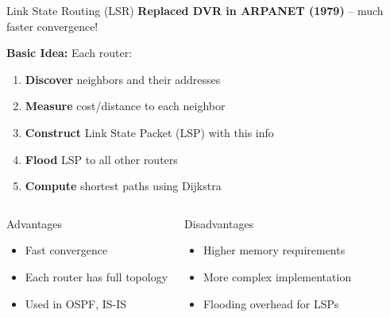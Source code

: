 \documentclass[aspectratio=169,11pt]{beamer}
\begin{document}
\begin{frame}{Link State Routing (LSR)}
    \textbf{Replaced DVR in ARPANET (1979)} -- much faster convergence!
    
    \vspace{0.3cm}
    \textbf{Basic Idea:} Each router:
    \begin{enumerate}
        \item \textbf{Discover} neighbors and their addresses
        \item \textbf{Measure} cost/distance to each neighbor
        \item \textbf{Construct} Link State Packet (LSP) with this info
        \item \textbf{Flood} LSP to all other routers
        \item \textbf{Compute} shortest paths using Dijkstra
    \end{enumerate}
    
    \vspace{0.3cm}
    \begin{columns}
        \begin{exampleblock}{Advantages}
            \begin{itemize}
                \item Fast convergence
                \item Each router has full topology
                \item Used in OSPF, IS-IS
            \end{itemize}
        \end{exampleblock}
        
        \begin{alertblock}{Disadvantages}
            \begin{itemize}
                \item Higher memory requirements
                \item More complex implementation
                \item Flooding overhead for LSPs
            \end{itemize}
        \end{alertblock}
    \end{columns}
\end{frame}
\end{document}
